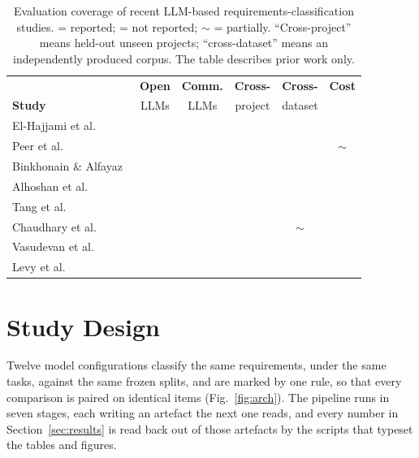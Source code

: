 \documentclass[conference]{IEEEtran}
\newcommand{\cmark}{\ding{51}}
\newcommand{\xmark}{\ding{55}}
\begin{document}
\begin{table}[t]
\caption{Evaluation coverage of recent LLM-based requirements-classification
studies. \cmark{} = reported; \xmark{} = not reported; $\sim$ = partially.
``Cross-project'' means held-out unseen projects; ``cross-dataset'' means an
independently produced corpus. The table describes prior work only.}
\label{tab:coverage}
\centering
\scriptsize
\setlength{\tabcolsep}{3.6pt}
\renewcommand{\arraystretch}{1.03}
\begin{tabular}{@{}lccccc@{}}
\toprule
& \textbf{Open} & \textbf{Comm.} & \textbf{Cross-} & \textbf{Cross-} & \textbf{Cost} \\
\textbf{Study} & LLMs & LLMs & project & dataset & \\
\midrule
El-Hajjami et al.~\cite{elhajjami2024}   & \xmark & \cmark & \xmark & \xmark & \xmark \\
Peer et al.~\cite{peer2024}              & \xmark & \cmark & \xmark & \xmark & $\sim$ \\
Binkhonain \& Alfayaz~\cite{binkhonain2025} & \cmark & \cmark & \xmark & \xmark & \xmark \\
Alhoshan et al.~\cite{alhoshan2025}      & \cmark & \xmark & \xmark & \xmark & \xmark \\
Tang et al.~\cite{tang2025}              & \cmark & \cmark & \xmark & \xmark & \xmark \\
Chaudhary et al.~\cite{chaudhary2025}    & \xmark & \cmark & \xmark & $\sim$ & \xmark \\
Vasudevan et al.~\cite{vasudevan2026}    & \xmark & \cmark & \xmark & \xmark & \xmark \\
Levy et al.~\cite{levy2026}              & \cmark & \cmark & \xmark & \xmark & \xmark \\
\bottomrule
\end{tabular}
\end{table}

\section{Study Design}
Twelve model configurations classify the same requirements, under the same
tasks, against the same frozen splits, and are marked by one rule, so that every
comparison is paired on identical items (Fig.~\ref{fig:arch}). The pipeline runs
in seven stages, each writing an artefact the next one reads, and every number
in Section~\ref{sec:results} is read back out of those artefacts by the scripts
that typeset the tables and figures.
\end{document}
